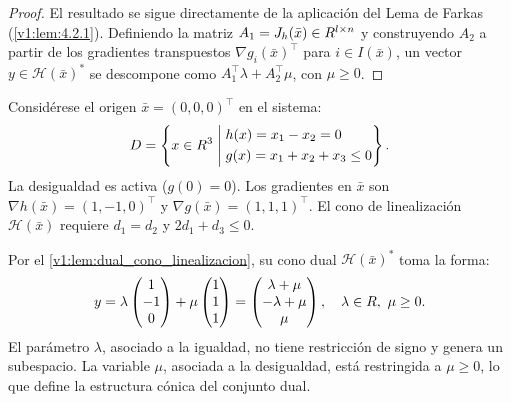 \begin{proof}
 El resultado se sigue directamente de la aplicación del Lema de Farkas (\cref{v1:lem:4.2.1}). Definiendo la matriz $A_1 = J_h(\bar{x}) \in R^{l \times n}$ y construyendo $A_2$ a partir de los gradientes transpuestos $\nabla g_i(\bar{x})^\top$ para $i \in I(\bar{x})$, un vector $y \in \mathcal{H}(\bar{x})^*$ se descompone como $A_1^\top \lambda + A_2^\top \mu$, con $\mu \ge 0$.
\end{proof}

\begin{example}\label{v1:exa:dual_linealizacion}
 Considérese el origen $\bar{x} = (0,0,0)^\top$ en el sistema:
 \[
 D = \left\{ x \in R^3 \mathrel{\Bigg|} \begin{aligned} &h(x) = x_1 - x_2 = 0 \\ &g(x) = x_1 + x_2 + x_3 \le 0 \end{aligned} \right\}.
 \]
 La desigualdad es activa ($g(0) = 0$). Los gradientes en $\bar{x}$ son $\nabla h(\bar{x}) = (1, -1, 0)^\top$ y $\nabla g(\bar{x}) = (1, 1, 1)^\top$. El cono de linealización $\mathcal{H}(\bar{x})$ requiere $d_1 = d_2$ y $2d_1 + d_3 \le 0$.
 
 Por el \cref{v1:lem:dual_cono_linealizacion}, su cono dual $\mathcal{H}(\bar{x})^*$ toma la forma:
 \[
 y = \lambda \begin{pmatrix} 1 \\ -1 \\ 0 \end{pmatrix} + \mu \begin{pmatrix} 1 \\ 1 \\ 1 \end{pmatrix} = \begin{pmatrix} \lambda + \mu \\ -\lambda + \mu \\ \mu \end{pmatrix}, \quad \lambda \in R, \ \mu \ge 0.
 \]
 El parámetro $\lambda$, asociado a la igualdad, no tiene restricción de signo y genera un subespacio. La variable $\mu$, asociada a la desigualdad, está restringida a $\mu \ge 0$, lo que define la estructura cónica del conjunto dual.
\end{example}

